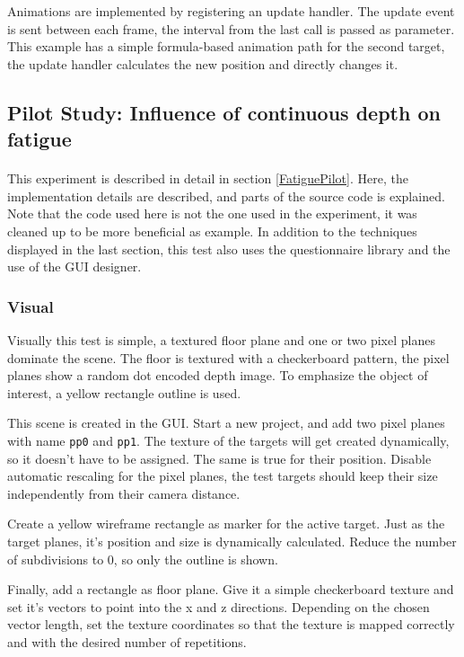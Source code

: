 Animations are implemented by registering an update handler.
The update event is sent between each frame, the interval from the last call is passed as parameter.
This example has a simple formula-based animation path for the second target, the update handler calculates the new position and directly changes it.


\subsection[Influence of continuous depth]{Pilot Study: Influence of continuous depth on fatigue\label{ExampleFatiguePilot}}
\paragraph{}
This experiment is described in detail in section \ref{FatiguePilot}.
Here, the implementation details are described, and parts of the source code is explained.
Note that the code used here is not the one used in the experiment, it was cleaned up to be more beneficial as example.
In addition to the techniques displayed in the last section, this test also uses the questionnaire library and the use of the GUI designer.

\subsubsection{Visual}
Visually this test is simple, a textured floor plane and one or two pixel planes dominate the scene.
The floor is textured with a checkerboard pattern, the pixel planes show a random dot encoded depth image.
To emphasize the object of interest, a yellow rectangle outline is used.

This scene is created in the GUI.
Start a new project, and add two pixel planes with name \texttt{pp0} and \texttt{pp1}.
The texture of the targets will get created dynamically, so it doesn't have to be assigned.
The same is true for their position.
Disable automatic rescaling for the pixel planes, the test targets should keep their size independently from their camera distance.

Create a yellow wireframe rectangle as marker for the active target.
Just as the target planes, it's position and size is dynamically calculated.
Reduce the number of subdivisions to 0, so only the outline is shown.

Finally, add a rectangle as floor plane.
Give it a simple checkerboard texture and set it's vectors to point into the x and z directions.
Depending on the chosen vector length, set the texture coordinates so that the texture is mapped correctly and with the desired number of repetitions.

